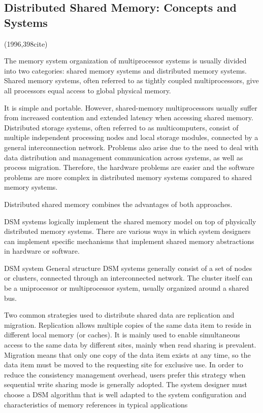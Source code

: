 \documentclass[a4paper,twoside]{scrbook}
\begin{document}
\subsection{Distributed Shared Memory: Concepts and Systems \cite{protic1996distributed}}
(1996,398cite)\par
The memory system organization of multiprocessor systems is usually divided into two categories: shared memory systems and distributed memory systems.
Shared memory systems, often referred to as tightly coupled multiprocessors, give all processors equal access to global physical memory.

It is simple and portable. However, shared-memory multiprocessors usually suffer from increased contention and extended latency when accessing shared memory. Distributed storage systems, often referred to as multicomputers, consist of multiple independent processing nodes and local storage modules, connected by a general interconnection network. Problems also arise due to the need to deal with data distribution and management communication across systems, as well as process migration. Therefore, the hardware problems are easier and the software problems are more complex in distributed memory systems compared to shared memory systems.

Distributed shared memory combines the advantages of both approaches.

DSM systems logically implement the shared memory model on top of physically distributed memory systems. There are various ways in which system designers can implement specific mechanisms that implement shared memory abstractions in hardware or software.

DSM system General structure DSM systems generally consist of a set of nodes or clusters, connected through an interconnected network. The cluster itself can be a uniprocessor or multiprocessor system, usually organized around a shared bus.

Two common strategies used to distribute shared data are replication and migration. Replication allows multiple copies of the same data item to reside in different local memory (or caches). It is mainly used to enable simultaneous access to the same data by different sites, mainly when read sharing is prevalent. Migration means that only one copy of the data item exists at any time, so the data item must be moved to the requesting site for exclusive use. In order to reduce the consistency management overhead, users prefer this strategy when sequential write sharing mode is generally adopted. The system designer must choose a DSM algorithm that is well adapted to the system configuration and characteristics of memory references in typical applications
\end{document}
